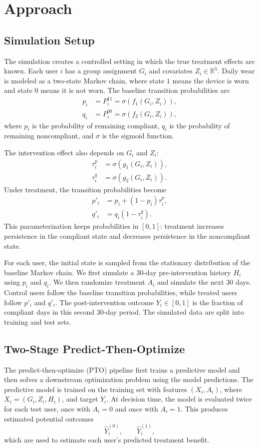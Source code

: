 \section{Approach}

\subsection{Simulation Setup}
The simulation creates a controlled setting in which the true treatment effects are known. Each user $i$ has a group assignment $G_i$ and covariates $Z_i \in \mathbb{R}^5$. Daily wear is modeled as a two-state Markov chain, where state $1$ means the device is worn and state $0$ means it is not worn. The baseline transition probabilities are
\begin{align*}
    p_i &= P_i^{11} = \sigma(f_1(G_i, Z_i)), \\
    q_i &= P_i^{00} = \sigma(f_2(G_i, Z_i)),
\end{align*}
where $p_i$ is the probability of remaining compliant, $q_i$ is the probability of remaining noncompliant, and $\sigma$ is the sigmoid function.

The intervention effect also depends on $G_i$ and $Z_i$:
\begin{align*}
    \tau^p_i &= \sigma(g_1(G_i, Z_i)), \\
    \tau^q_i &= \sigma(g_2(G_i, Z_i)).
\end{align*}
Under treatment, the transition probabilities become
\begin{align*}
    p'_i &= p_i + (1-p_i)\tau^p_i, \\
    q'_i &= q_i(1-\tau^q_i).
\end{align*}
This parameterization keeps probabilities in $[0,1]$: treatment increases persistence in the compliant state and decreases persistence in the noncompliant state.

For each user, the initial state is sampled from the stationary distribution of the baseline Markov chain. We first simulate a 30-day pre-intervention history $H_i$ using $p_i$ and $q_i$. We then randomize treatment $A_i$ and simulate the next 30 days. Control users follow the baseline transition probabilities, while treated users follow $p'_i$ and $q'_i$. The post-intervention outcome $Y_i \in [0,1]$ is the fraction of compliant days in this second 30-day period. The simulated data are split into training and test sets.

\subsection{Two-Stage Predict-Then-Optimize}
The predict-then-optimize (PTO) pipeline first trains a predictive model and then solves a downstream optimization problem using the model predictions. The predictive model is trained on the training set with features $(X_i,A_i)$, where $X_i=(G_i,Z_i,H_i)$, and target $Y_i$. At decision time, the model is evaluated twice for each test user, once with $A_i=0$ and once with $A_i=1$. This produces estimated potential outcomes
\[
\hat{Y}_i^{(0)}, \qquad \hat{Y}_i^{(1)},
\]
which are used to estimate each user's predicted treatment benefit.

